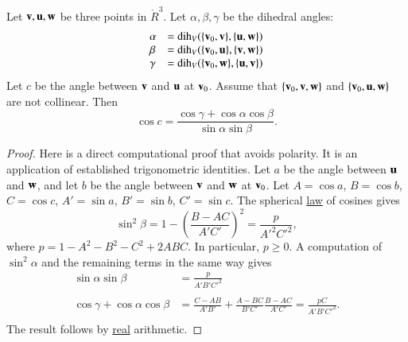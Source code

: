 \begin{lemma}
\label{lemma:sloc2}
Let ${\mathbf v},{\mathbf u},{\mathbf w}$ be three points in $\ring{R}^3$.
Let $\alpha,\beta,\gamma$ be the dihedral angles: 
   \begin{displaymath}
   \begin{array}{lll}
     \alpha &= \operatorname{dih}_V(\{{\mathbf v}_0,{\mathbf v}\},\{{\mathbf u},{\mathbf w}\})\\
     \beta &= \operatorname{dih}_V(\{{\mathbf v}_0,{\mathbf u}\},\{{\mathbf v},{\mathbf w}\})\\
     \gamma&= \operatorname{dih}_V(\{{\mathbf v}_0,{\mathbf w}\},\{{\mathbf u},{\mathbf v}\})\\
     \end{array}
   \end{displaymath}
Let $c$ be the
angle between ${\mathbf v}$ and ${\mathbf u}$ at ${\mathbf v}_0$. 
Assume that $\{{\mathbf v}_0,{\mathbf v},{\mathbf w}\}$ and $\{{\mathbf v}_0,{\mathbf u},{\mathbf w}\}$ are not collinear.
Then
    \begin{displaymath}
    \cos c = \frac{\cos \gamma + \cos \alpha \cos \beta}
     {\sin \alpha\sin \beta}.
    \end{displaymath}
\end{lemma}
%
%

\begin{proof}  
Here is a direct
computational proof that avoids polarity.  It is an application of established
trigonometric identities.
Let $a$ be the angle between ${\mathbf u}$ and ${\mathbf w}$, and let $b$ be the angle
between ${\mathbf v}$ and ${\mathbf w}$ at ${\mathbf v}_0$.
Let $A=\cos a$, $B=\cos b$, $C=\cos c$,
$A'=\sin a$, $B'=\sin b$, $C'=\sin c$.  The
spherical \hyperref[lemma:sloc]{law} of cosines gives
   \begin{displaymath}\sin^2\beta = 1-\left(\frac{B-A C}{A' C'}\right)^2
     = \frac{p}{A'^2 C'^2},\end{displaymath}
where $p=1-A^2 - B^2 - C^2 + 2 A B C$.
In particular, $p\ge 0$.
%
A computation of $\sin^2\alpha$ and the remaining terms in the same way gives
   \begin{displaymath}
   \begin{array}{lll}
     \sin\alpha\sin\beta &= \frac{\displaystyle p}{\displaystyle A' B' C'^2}\\ 
      \\
     \cos\gamma + \cos\alpha \cos\beta &=
         \frac{\displaystyle C - A B}{\displaystyle A' B'} + \frac{\displaystyle A - B C}{\displaystyle B' C'} \frac{\displaystyle B - A C}{\displaystyle A' C'}
         = \frac{\displaystyle p C}{\displaystyle A' B' C'^2}.\\
   \end{array}
   \end{displaymath}
The result follows by \hyperref[back:analysis]{real} arithmetic.
\end{proof}

